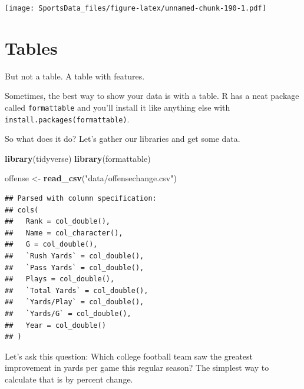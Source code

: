 \documentclass[]{book}
\newenvironment{Shaded}{\begin{snugshade}}{\end{snugshade}}
\newcommand{\KeywordTok}[1]{\textcolor[rgb]{0.13,0.29,0.53}{\textbf{#1}}}
\newcommand{\StringTok}[1]{\textcolor[rgb]{0.31,0.60,0.02}{#1}}
\newcommand{\NormalTok}[1]{#1}
\begin{document}
\texttt{[image: SportsData\_files/figure-latex/unnamed-chunk-190-1.pdf]}

\chapter{Tables}\label{tables}

But not a table. A table with features.

Sometimes, the best way to show your data is with a table. R has a neat
package called \texttt{formattable} and you'll install it like anything
else with
\texttt{install.packages(\textquotesingle{}formattable\textquotesingle{})}.

So what does it do? Let's gather our libraries and get some data.

\begin{Shaded}
\begin{Highlighting}[]
\KeywordTok{library}\NormalTok{(tidyverse)}
\KeywordTok{library}\NormalTok{(formattable)}
\end{Highlighting}
\end{Shaded}

\begin{Shaded}
\begin{Highlighting}[]
\NormalTok{offense <-}\StringTok{ }\KeywordTok{read_csv}\NormalTok{(}\StringTok{"data/offensechange.csv"}\NormalTok{)}
\end{Highlighting}
\end{Shaded}

\begin{verbatim}
## Parsed with column specification:
## cols(
##   Rank = col_double(),
##   Name = col_character(),
##   G = col_double(),
##   `Rush Yards` = col_double(),
##   `Pass Yards` = col_double(),
##   Plays = col_double(),
##   `Total Yards` = col_double(),
##   `Yards/Play` = col_double(),
##   `Yards/G` = col_double(),
##   Year = col_double()
## )
\end{verbatim}

Let's ask this question: Which college football team saw the greatest
improvement in yards per game this regular season? The simplest way to
calculate that is by percent change.
\end{document}
